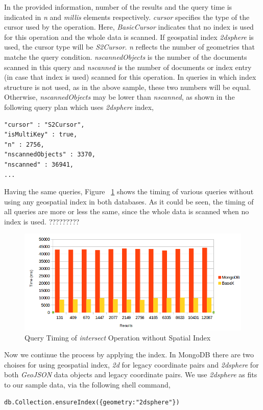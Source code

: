 \documentclass[a4paper,12pt]{article}
\begin{document}
In the provided information, number of the results and the query time is indicated in \textit{n} and \textit{millis} elements respectively. \textit{cursor} specifies the type of the cursor used by the operation. Here, \textit{BasicCursor} indicates that no index is used for this operation and the whole data is scanned. If geospatial index \textit{2dsphere} is used, the cursor type will be \textit{S2Cursor}. \textit{n} reflects the number of geometries that matche the query condition. \textit{nscannedObjects} is the number of the documents scanned in this query and \textit{nscanned} is the number of documents or index entry (in case that index is used) scanned for this operation. In queries in which index structure is not used, as in the above sample, these two numbers will be equal. Otherwise, \textit{nscannedObjects} may be lower than \textit{nscanned}, as shown in the following query plan which uses \textit{2dsphere} index, 

\begin{verbatim}
"cursor" : "S2Cursor",
"isMultiKey" : true,
"n" : 2756,
"nscannedObjects" : 3370,
"nscanned" : 36941,
...
\end{verbatim}

Having the same queries, Figure ~\ref{figBXvsMongoNoIndexIntersects} shows the timing of various queries without using any geospatial index in both databases. As it could be seen, the timing of all queries are more or less the same, since the whole data is scanned when no index is used. ?????????

\begin{figure}
\centering
\includegraphics[width=\textwidth,height=0.25\textheight]{BXvsMongo-NoIndex-Intersects}
\caption{Query Timing of \textit{intersect} Operation without Spatial Index}
\label{figBXvsMongoNoIndexIntersects}
\end{figure}

Now we continue the process by applying the index. In MongoDB there are two choises for using geospatial index, \textit{2d} for legacy coordinate pairs and \textit{2dsphere} for both \textit{GeoJSON} data objects and legacy coordinate pairs. We use \textit{2dsphere} as fits to our sample data, via the following shell command,
\begin{verbatim}
db.Collection.ensureIndex({geometry:"2dsphere"})  
\end{verbatim}
\end{document}
